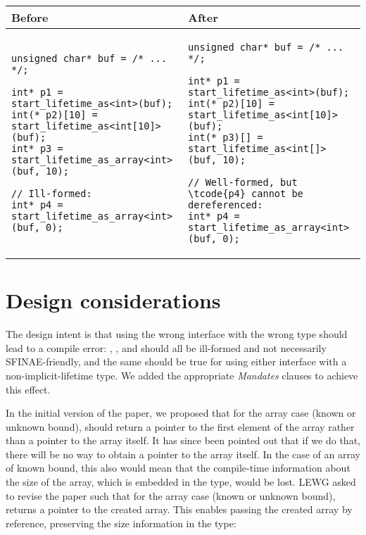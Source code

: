 \begin{tabular}{|l|l|}
\hline
\textbf{Before}  &  \textbf{After} \\
\hline
\footnotesize
\begin{lstlisting}[basicstyle=\footnotesize \ttfamily]
unsigned char* buf = /* ... */;

int* p1 = start_lifetime_as<int>(buf);
int(* p2)[10] = start_lifetime_as<int[10]>(buf);
int* p3 = start_lifetime_as_array<int>(buf, 10);

// Ill-formed:
int* p4 = start_lifetime_as_array<int>(buf, 0);
\end{lstlisting}&
\begin{lstlisting}[basicstyle=\footnotesize \ttfamily]
unsigned char* buf = /* ... */;

int* p1 = start_lifetime_as<int>(buf);
int(* p2)[10] = start_lifetime_as<int[10]>(buf);
int(* p3)[] = start_lifetime_as<int[]>(buf, 10);

// Well-formed, but \tcode{p4} cannot be dereferenced:
int* p4 = start_lifetime_as_array<int>(buf, 0);
\end{lstlisting} \\
\hline
\end{tabular} 

\section{Design considerations}
\label{sec:design}

The design intent is that using the wrong interface with the wrong type should lead to a compile error: , , and  should all be ill-formed and not necessarily SFINAE-friendly, and the same should be true for using either interface with a non-implicit-lifetime type. We added the appropriate \emph{Mandates} clauses to achieve this effect.

In the initial version of the paper, we proposed that for the array case (known or unknown bound),  should return a pointer to the first element of the array rather than a pointer to the array itself. It has since been pointed out that if we do that, there will be no way to obtain a pointer to the array itself. In the case of an array of known bound, this also would mean that the compile-time information about the size of the array, which is embedded in the type, would be lost. LEWG asked to revise the paper such that for the array case (known or unknown bound),  returns a pointer to the created array. This enables passing the created array by reference, preserving the size information in the type:

